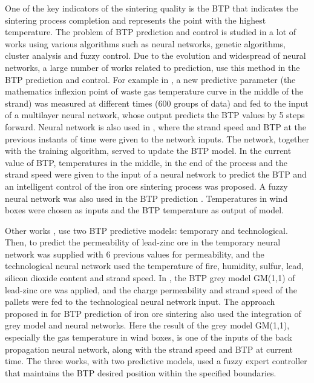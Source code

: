 \documentclass[AMS,STIX2COL]{WileyNJD-v2}
\begin{document}
One of the key indicators of the sintering quality is the BTP that indicates the sintering process completion and represents the point with the highest temperature. The problem of BTP prediction and control is studied in a lot of works using various algorithms such as neural networks, genetic algorithms, cluster analysis and fuzzy control. Due to the evolution and widespread of neural networks, a large number of works related to prediction, use this method in the BTP prediction and control. For example in \cite{Feng2000}, a new predictive parameter (the mathematics inflexion point of waste gas temperature curve in the middle of the strand) was measured at different times (600 groups of data) and fed to the input of a multilayer neural network, whose output predicts the BTP values by 5 steps forward. Neural network is also used in \cite{LiPeng2006}, where the strand speed and BTP at the previous instants of time were given to the network inputs. The network, together with the training algorithm, served to update the BTP model. In \cite{Du2017} the current value of BTP, temperatures in the middle, in the end of the process and the strand speed were given to the input of a neural network to predict the BTP and an intelligent control of the iron ore sintering process was proposed. A fuzzy neural network was also used in the BTP prediction \cite{Wang20141}. Temperatures in wind boxes were chosen as inputs and the BTP temperature as output of model.

Other works \cite{Wu2006}, \cite{Wu2012} use two BTP predictive models: temporary and technological. Then, to predict the permeability of lead-zinc ore in \cite{Wu2006} the temporary neural network was supplied with 6 previous values for permeability, and the technological neural network used the temperature of fire, humidity, sulfur, lead, silicon dioxide content and strand speed. In \cite{Wu2012}, the BTP grey model GM(1,1) of lead-zinc ore was applied, and the charge permeability and strand speed of the pallets were fed to the technological neural network input. The approach proposed in \cite{Wu2012b} for BTP prediction of iron ore sintering also used the integration of grey model and neural networks. Here the result of the grey model GM(1,1), especially the gas temperature in wind boxes, is one of the inputs of the back propagation neural network, along with the strand speed and BTP at current time. The three works, with two predictive models, used a fuzzy expert controller that maintains the BTP desired position within the specified boundaries.
\end{document}
